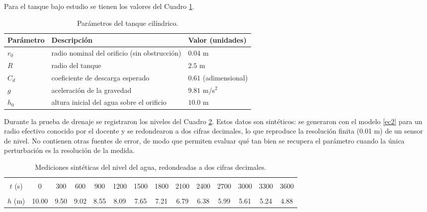 \documentclass[oneside,letter,spanish,activeacute,english,links,10pt]{amcaGCS_EDO}
\begin{document}
Para el tanque bajo estudio se tienen los valores del Cuadro \ref{tab:parametros}.
\begin{table}[h]
	\centering
	\begin{tabular}{lll}
		\hline
		Parámetro & Descripción & Valor (unidades) \\
		\hline
		$r_0$ & radio nominal del orificio (sin obstrucción) & $0.04$ m \\
		$R$   & radio del tanque              & $2.5$ m \\
		$C_d$ & coeficiente de descarga esperado      & $0.61$ (adimensional) \\
		$g$   & aceleración de la gravedad  & $9.81$ m/s$^{2}$ \\
		$h_0$ & altura inicial del agua sobre el orificio & $10.0$ m \\
		\hline
	\end{tabular}
	\caption{Parámetros del tanque cilíndrico.}\label{tab:parametros}
\end{table}

Durante la prueba de drenaje se registraron los niveles del Cuadro \ref{tab:datos_altura}. Estos datos son sintéticos: se generaron con el modelo \eqref{ec2} para un radio efectivo conocido por el docente y se redondearon a dos cifras decimales, lo que reproduce la resolución finita (0.01 m) de un sensor de nivel. No contienen otras fuentes de error, de modo que permiten evaluar qué tan bien se recupera el parámetro cuando la única perturbación es la resolución de la medida.
\begin{table}[H]
	\centering
	\small
	\setlength{\tabcolsep}{4pt}\renewcommand{\arraystretch}{1.3}
	\begin{tabular}{c|ccccccccccccc}
		\hline\\[-12pt]
		$t$ (s)
		& 0 & 300 & 600 & 900 & 1200 & 1500 & 1800 & 2100 & 2400 & 2700 & 3000 & 3300 & 3600 \\
		\hline\\[-12pt]
		$h$ (m)
		& 10.00 & 9.50 & 9.02 & 8.55 & 8.09 & 7.65 & 7.21 & 6.79 & 6.38 & 5.99 & 5.61 & 5.24 & 4.88\\
		\hline
	\end{tabular}
	\caption{Mediciones sintéticas del nivel del agua, redondeadas a dos cifras decimales.}\label{tab:datos_altura}
\end{table}
\end{document}
